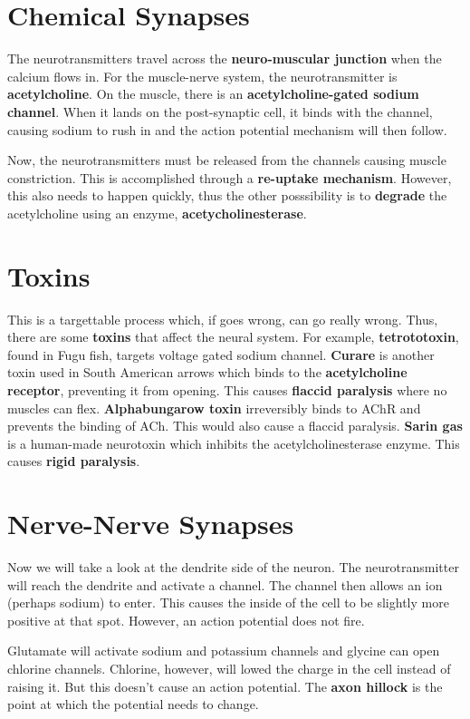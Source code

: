 \documentclass{article}
\begin{document}
\section{ Chemical Synapses }

The neurotransmitters travel across the \textbf{neuro-muscular junction} when
the calcium flows in. For the muscle-nerve system, the neurotransmitter is
\textbf{acetylcholine}. On the muscle, there is an \textbf{acetylcholine-gated
sodium channel}. When it lands on the post-synaptic cell, it binds with the
channel, causing sodium to rush in and the action potential mechanism will then
follow. 

Now, the neurotransmitters must be released from the channels causing muscle
constriction. This is accomplished through a \textbf{re-uptake mechanism}.
However, this also needs to happen quickly, thus the other posssibility is to
\textbf{degrade} the acetylcholine using an enzyme,
\textbf{acetycholinesterase}. 

\section{ Toxins }

This is a targettable process which, if goes wrong, can go really wrong. Thus,
there are some \textbf{toxins} that affect the neural system. For example,
\textbf{tetrototoxin}, found in Fugu fish, targets voltage gated sodium channel.
\textbf{Curare} is another toxin used in South American arrows which binds to
the \textbf{acetylcholine receptor}, preventing it from opening. This causes
\textbf{flaccid paralysis} where no muscles can flex. \textbf{Alphabungarow
toxin} irreversibly binds to AChR and prevents the binding of ACh. This would
also cause a flaccid paralysis. \textbf{Sarin gas} is a human-made neurotoxin
which inhibits the acetylcholinesterase enzyme. This causes \textbf{rigid
paralysis}. 

\section{ Nerve-Nerve Synapses }

Now we will take a look at the dendrite side of the neuron. The neurotransmitter
will reach the dendrite and activate a channel. The channel then allows an ion
(perhaps sodium) to enter. This causes the inside of the cell to be slightly
more positive at that spot. However, an action potential does not fire. 

Glutamate will activate sodium and potassium channels and glycine can open
chlorine channels. Chlorine, however, will lowed the charge in the cell instead
of raising it. But this doesn't cause an action potential. The \textbf{axon
hillock} is the point at which the potential needs to change. 
\end{document}
